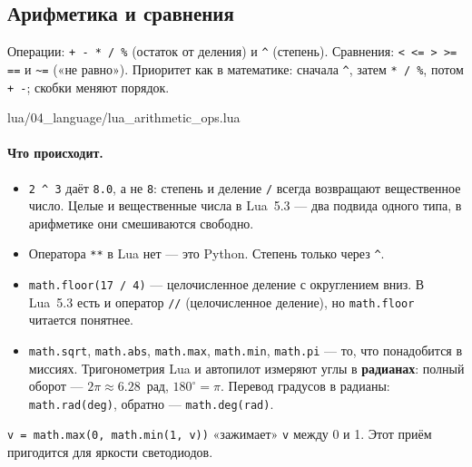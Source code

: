 \subsection{Арифметика и сравнения}

Операции: \verb|+ - * / %| (остаток от деления) и \verb|^| (степень). Сравнения: \verb|< <= > >= ==| и \verb|~=| («не равно»). Приоритет как в математике: сначала \verb|^|, затем \verb|* / %|, потом \verb|+ -|; скобки меняют порядок.

\begin{codefile}{lua/04_language/lua_arithmetic_ops.lua}
\end{codefile}

\paragraph{Что происходит.}
\begin{itemize}
    \item \verb|2 ^ 3| даёт \verb|8.0|, а не \verb|8|: степень и деление \verb|/| всегда возвращают вещественное число. Целые и вещественные числа в Lua~5.3 --- два подвида одного типа, в арифметике они смешиваются свободно.
    \item Оператора \verb|**| в Lua нет --- это Python. Степень только через \verb|^|.
    \item \verb|math.floor(17 / 4)| --- целочисленное деление с округлением вниз. В Lua~5.3 есть и оператор \verb|//| (целочисленное деление), но \verb|math.floor| читается понятнее.
    \item \verb|math.sqrt|, \verb|math.abs|, \verb|math.max|, \verb|math.min|, \verb|math.pi| --- то, что понадобится в миссиях. Тригонометрия Lua и автопилот измеряют углы в \textbf{радианах}: полный оборот --- $2\pi \approx 6.28$~рад, $180^\circ = \pi$. Перевод градусов в радианы: \verb|math.rad(deg)|, обратно --- \verb|math.deg(rad)|.
\end{itemize}

\begin{hintbox}
\verb|v = math.max(0, math.min(1, v))| «зажимает» \verb|v| между 0 и 1. Этот приём пригодится для яркости светодиодов.
\end{hintbox}

